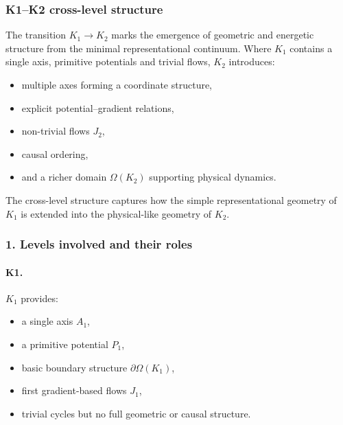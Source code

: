 
\subsubsection{K1–K2 cross-level structure}
\label{sec:crossk-k1-k2}

The transition $K_1 \rightarrow K_2$ marks the emergence of geometric and
energetic structure from the minimal representational continuum.
Where $K_1$ contains a single axis, primitive potentials and trivial flows,
$K_2$ introduces:
\begin{itemize}
  \item multiple axes forming a coordinate structure,
  \item explicit potential–gradient relations,
  \item non-trivial flows $J_2$,
  \item causal ordering,
  \item and a richer domain $\Omega(K_2)$ supporting physical dynamics.
\end{itemize}

The cross-level structure captures how the simple representational geometry
of $K_1$ is extended into the physical-like geometry of $K_2$.

\subsubsection{1. Levels involved and their roles}

\paragraph{K1.}
$K_1$ provides:
\begin{itemize}
  \item a single axis $A_1$,
  \item a primitive potential $P_1$,
  \item basic boundary structure $\partial\Omega(K_1)$,
  \item first gradient-based flows $J_1$,
  \item trivial cycles but no full geometric or causal structure.
\end{itemize}

